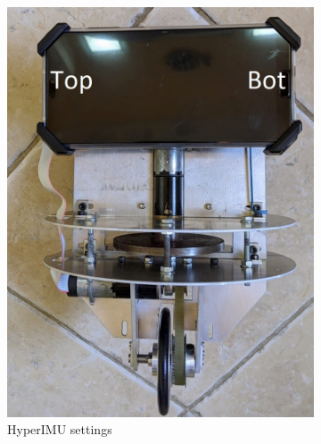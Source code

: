 \documentclass[twoside,twocolumn,12pt]{article}
\begin{document}
\begin{figure}[t]
\begin{subfigure}[t]{0.325\textwidth}
    \includegraphics[width=\linewidth]{front_lab}
    \caption{HyperIMU settings}
  \label{fig:imuset}
  \end{subfigure}
  \begin{subfigure}[t]{0.325\textwidth}

\end{subfigure}
\end{figure}
\end{document}
